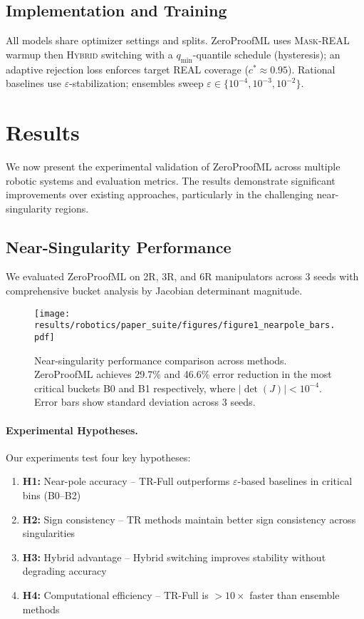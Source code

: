 \documentclass[twoside,11pt]{article}
\newcommand{\trReal}{\textsc{REAL}}
\newcommand{\maskreal}{\textsc{Mask-REAL}}
\newcommand{\hybrid}{\textsc{Hybrid}}
\newcommand{\qmin}{q_{\min}}
\begin{document}
\subsection{Implementation and Training}
All models share optimizer settings and splits. ZeroProofML uses \maskreal{} warmup then \hybrid{} switching with a $\qmin$-quantile schedule (hysteresis); an adaptive rejection loss enforces target \trReal{} coverage ($c^\ast\!\approx\!0.95$). Rational baselines use $\varepsilon$-stabilization; ensembles sweep $\varepsilon\in\{10^{-4},10^{-3},10^{-2}\}$.

\section{Results}
\label{sec:results}
We now present the experimental validation of ZeroProofML across multiple robotic systems and evaluation metrics. The results demonstrate significant improvements over existing approaches, particularly in the challenging near-singularity regions.

\subsection{Near-Singularity Performance}

We evaluated ZeroProofML on 2R, 3R, and 6R manipulators across 3 seeds with comprehensive bucket analysis by Jacobian determinant magnitude.

\begin{figure}[t]
\centering
\texttt{[image: results/robotics/paper\_suite/figures/figure1\_nearpole\_bars.pdf]}
\caption{Near-singularity performance comparison across methods. ZeroProofML achieves 29.7\% and 46.6\% error reduction in the most critical buckets B0 and B1 respectively, where $|\det(J)| < 10^{-4}$. Error bars show standard deviation across 3 seeds.}
\label{fig:nearpole_performance}
\end{figure}


\paragraph{Experimental Hypotheses.}
Our experiments test four key hypotheses:
\begin{enumerate}
\item \textbf{H1:} Near-pole accuracy -- TR-Full outperforms $\varepsilon$-based baselines in critical bins (B0--B2)
\item \textbf{H2:} Sign consistency -- TR methods maintain better sign consistency across singularities
\item \textbf{H3:} Hybrid advantage -- Hybrid switching improves stability without degrading accuracy
\item \textbf{H4:} Computational efficiency -- TR-Full is $>10\times$ faster than ensemble methods
\end{enumerate}
\end{document}
